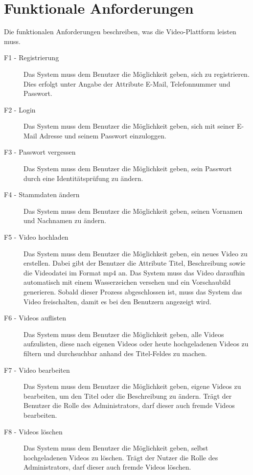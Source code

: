 \section{Funktionale Anforderungen}

Die funktionalen Anforderungen beschreiben, was die Video-Plattform leisten muss.

\begin{description}
   \item[F1 - Registrierung] Das System muss dem Benutzer die Möglichkeit geben, sich zu registrieren. Dies erfolgt unter Angabe der Attribute E-Mail, Telefonnummer und Passwort.
   \item[F2 - Login] Das System muss dem Benutzer die Möglichkeit geben, sich mit seiner E-Mail Adresse und seinem Passwort einzuloggen.
   \item[F3 - Passwort vergessen] Das System muss dem Benutzer die Möglichkeit geben, sein Passwort durch eine Identitätsprüfung zu ändern.
   \item[F4 - Stammdaten ändern] Das System muss dem Benutzer die Möglichkeit geben, seinen Vornamen und Nachnamen zu ändern.
   \item[F5 - Video hochladen] Das System muss dem Benutzer die Möglichkeit geben, ein neues Video zu erstellen. Dabei gibt der Benutzer die Attribute Titel, Beschreibung sowie die Videodatei im Format mp4 an. Das System muss das Video daraufhin automatisch mit einem Wasserzeichen versehen und ein Vorschaubild generieren. Sobald dieser Prozess abgeschlossen ist, muss das System das Video freischalten, damit es bei den Benutzern angezeigt wird.
   \item[F6 - Videos auflisten] Das System muss dem Benutzer die Möglichkeit geben, alle Videos aufzulisten, diese nach eigenen Videos oder heute hochgeladenen Videos zu filtern und durchsuchbar anhand des Titel-Feldes zu machen.
   \item[F7 - Video bearbeiten] Das System muss dem Benutzer die Möglichkeit geben, eigene Videos zu bearbeiten, um den Titel oder die Beschreibung zu ändern. Trägt der Benutzer die Rolle des Administrators, darf dieser auch fremde Videos bearbeiten.
   \item[F8 - Videos löschen] Das System muss dem Benutzer die Möglichkeit geben, selbst hochgeladenen Videos zu löschen. Trägt der Nutzer die Rolle des Administrators, darf dieser auch fremde Videos löschen.
\end{description}